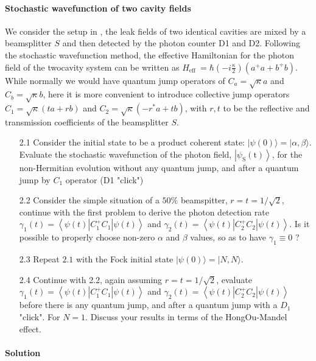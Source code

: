 \documentclass[hyperref, a4paper]{article}
\begin{document}
\paragraph{Stochastic wavefunction of two cavity fields} We consider the setup in , the leak fields of two identical cavities are mixed by a beamsplitter $S$ and then detected by the photon counter D1 and D2. Following the stochastic wavefunction method, the effective Hamiltonian for the photon field of the twocavity system can be written as $H_{\text {eff }}=\hbar\left(-i \frac{\kappa}{2}\right)\left(a^{+} a+b^{+} b\right)$. While normally we would have quantum jump operators of $C_{a}=\sqrt{\kappa} a$ and $C_{b}=\sqrt{\kappa} b$, here it is more convenient to introduce collective jump operators $C_{1}=\sqrt{\kappa}(t a+r b)$ and $C_{2}=\sqrt{\kappa}\left(-r^{*} a+t b\right)$, with $r, t$ to be the reflective and transmission coefficients of the beamsplitter $S$.

\begin{itemize}
    \item[2.1] Consider the initial state to be a product coherent state: $|\psi(0)\rangle=|\alpha, \beta\rangle$.
    Evaluate the stochastic wavefunction of the photon field, $\left|\psi_{\mathrm{S}}(\mathrm{t})\right\rangle$, for the non-Hermitian evolution without any quantum jump, and after a quantum jump by $C_{1}$ operator (D1 "click")
    \item[2.2] Consider the simple situation of a $50 \%$ beamspitter, $r=t=1 / \sqrt{2}$, continue with the first problem to derive the photon detection rate $\gamma_{1}(t)=\left\langle\psi(t)\left|C_{1}^{+} C_{1}\right| \psi(t)\right\rangle$ and $\gamma_{2}(t)=\left\langle\psi(t)\left|C_{2}^{+} C_{2}\right| \psi(t)\right\rangle$. Is it possible to properly choose non-zero $\alpha$ and $\beta$ values, so as to have $\gamma_{1} \equiv 0$ ?
    \item[2.3] Repeat $2.1$ with the Fock initial state $|\psi(0)\rangle=|N, N\rangle$.
    \item[2.4] Continue with 2.2, again assuming $r=t=1 / \sqrt{2}$, evaluate $\gamma_{1}(t)=\left\langle\psi(t)\left|C_{1}^{+} C_{1}\right| \psi(t)\right\rangle$ and $\gamma_{2}(t)=\left\langle\psi(t)\left|C_{2}^{+} C_{2}\right| \psi(t)\right\rangle$ before there is any quantum jump, and after a quantum jump with a $D_{1}$ "click". For $N=1$. Discuss your results in terms of the HongOu-Mandel effect.
\end{itemize}

\paragraph{Solution}
\end{document}
